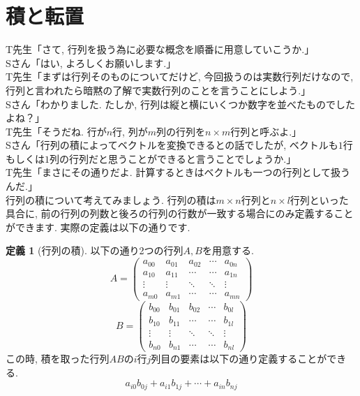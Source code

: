 \documentclass[a4paper,12pt]{jreport}
\theoremstyle{definition}
\newtheorem{defi}{定義}
\begin{document}
   \section{積と転置}
   T先生「さて, 行列を扱う為に必要な概念を順番に用意していこうか.」\\

   Sさん「はい, よろしくお願いします.」\\

   T先生「まずは行列そのものについてだけど, 今回扱うのは実数行列だけなので, 行列と言われたら暗黙の了解で実数行列のことを言うことにしよう.」\\

   Sさん「わかりました. たしか, 行列は縦と横にいくつか数字を並べたものでしたよね？」\\

   T先生「そうだね. 行が$n$行, 列が$m$列の行列を$n\times m$行列と呼ぶよ.」\\

   Sさん「行列の積によってベクトルを変換できるとの話でしたが, ベクトルも$1$行もしくは$1$列の行列だと思うことができると言うことでしょうか.」\\

   T先生「まさにその通りだよ. 計算するときはベクトルも一つの行列として扱うんだ.」\\

   行列の積について考えてみましょう.
   行列の積は$m\times n$行列と$n\times l$行列といった具合に,
   前の行列の列数と後ろの行列の行数が一致する場合にのみ定義することができます.
   実際の定義は以下の通りです.
   \begin{defi}[行列の積]
      以下の通り2つの行列$A, B$を用意する.
      $$
      A=
      \begin{pmatrix}
         a_{00} &a_{01} &a_{02}& \cdots &a_{0n}\\
         a_{10} &a_{11} &\cdots& \cdots &a_{1n}\\
         \vdots &\vdots &\ddots& \ddots &\vdots\\
         a_{m0} &a_{m1} &\cdots &\cdots &a_{mn}
      \end{pmatrix}
      $$
      $$
      B=
      \begin{pmatrix}
         b_{00} &b_{01} &b_{02}& \cdots &b_{0l}\\
         b_{10} &b_{11} &\cdots& \cdots &b_{1l}\\
         \vdots &\vdots &\ddots& \ddots &\vdots\\
         b_{n0} &b_{n1} &\cdots &\cdots &b_{nl}
      \end{pmatrix}
      $$
      この時, 積を取った行列$AB$の$i$行$j$列目の要素は以下の通り定義することができる.
      $$
      a_{i0}b_{0j}+a_{i1}b_{1j}+\cdots+a_{in}b_{nj}
      $$
   \end{defi}
\end{document}
